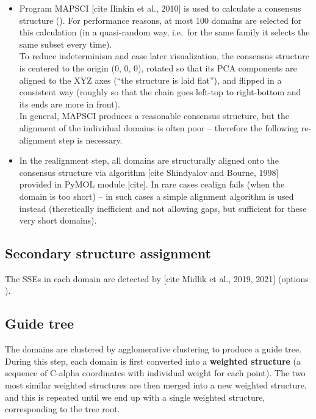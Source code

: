 \documentclass{article}
\begin{document}
\begin{itemize}
\item
  Program MAPSCI {[}cite Ilinkin et al., 2010{]} is used to calculate a
  consensus structure ().
  For performance reasons, at most 100 domains are selected for this
  calculation (in a quasi-random way, i.e.~for the same family it selects 
  the same subset every time).\\
  To reduce indeterminism and ease later visualization, the consensus
  structure is centered to the origin (0, 0, 0), rotated so that its PCA
  components are aligned to the XYZ axes (``the structure is laid
  flat''), and flipped in a consistent way (roughly so that the chain
  goes left-top to right-bottom and its ends are more in front).\\
  In general, MAPSCI produces a reasonable consensus structure, but the
  alignment of the individual domains is often poor -- therefore the
  following re-alignment step is necessary.
\item
  In the realignment step, all domains are structurally aligned onto the
  consensus structure via  algorithm {[}cite Shindyalov
  and Bourne, 1998{]} provided in PyMOL module {[}cite{]}. In rare cases
  cealign fails (when the domain is too short) -- in such cases a
  simple alignment algorithm  is used instead
  (theretically inefficient and not allowing gaps, but sufficient for these
  very short domains).
\end{itemize}



\subsection{Secondary structure assignment}

The SSEs in each domain are detected by  {[}cite
Midlik et al., 2019, 2021{]} (options 
 ).



\subsection{Guide tree}

The domains are clustered by agglomerative clustering to produce a guide
tree. During this step, each domain is first converted into a
\textbf{weighted structure} (a sequence of C-alpha coordinates with
individual weight for each point). The two most similar weighted
structures are then merged into a new weighted structure, and this is
repeated until we end up with a single weighted structure, corresponding
to the tree root.
\end{document}
